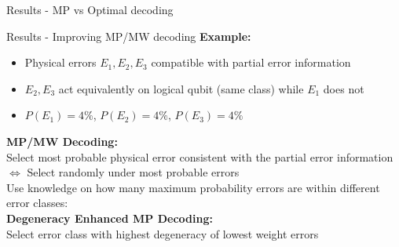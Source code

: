 \documentclass{dfki}
\begin{document}
\begin{frame}{Results - MP vs Optimal decoding}
{\begin{textblock*}{7.5cm}
		\end{textblock*}
	}
\end{frame}

\begin{frame}{Results - Improving MP/MW decoding}
	\textbf{Example:}
	\begin{itemize}
		\item Physical errors $E_{1}, E_{2}, E_{3}$ compatible with partial error information\\
		\pause
		\item $E_{2}, E_{3}$ act equivalently on logical qubit (same class) while $E_{1}$ does not\\
		\pause
		\item $P(E_{1})=4\%$, $P(E_{2})=4\%$, $P(E_{3})=4\%$
	\end{itemize}
	\pause
	\textbf{MP/MW Decoding:}\\
	Select most probable physical error consistent with the partial error information\\
	$\Leftrightarrow$ Select randomly under most probable errors\\
	\pause
	Use knowledge on how many maximum probability errors are within different error classes:\\
	\textbf{Degeneracy Enhanced MP Decoding:}\\
	Select error class with highest degeneracy of lowest weight errors\\
\end{frame}
\end{document}
